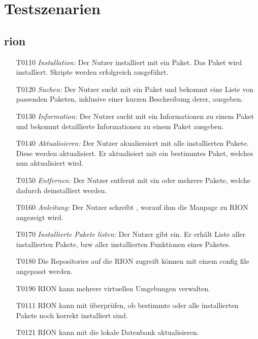 \chapter{Testszenarien}

\section{rion}

\begin{itemize}
	\item[T0110] \textit{Installation:} Der Nutzer installiert mit  ein Paket. Das Paket wird installiert. Skripte werden erfolgreich ausgeführt.
	\item[T0120] \textit{Suchen:} Der Nutzer sucht mit  ein Paket und bekommt eine Liste von passenden Paketen, inklusive einer kurzen Beschreibung derer, ausgeben.
	\item[T0130] \textit{Information:} Der Nutzer sucht mit  ein Informationen zu einem Paket und bekommt detaillierte Informationen zu einem Paket ausgeben.
	\item[T0140] \textit{Aktualisieren:} Der Nutzer akualiersiert mit  alle installierten Pakete. Diese werden aktualisiert. Er aktualisiert mit  ein bestimmtes Paket, welches nun aktualisiert wird.

	\item[T0150] \textit{Entfernen:} Der Nutzer entfernt mit  ein oder mehrere Pakete, welche dadurch deinstalliert werden.
	\item[T0160] \textit{Anleitung:} Der Nutzer schreibt , worauf ihm die Manpage zu RION angezeigt wird.
	\item[T0170] \textit{Installierte Pakete listen:} Der Nutzer gibt  ein. Er erhält Liste aller installierten Pakete, bzw aller installierten Funktionen eines Paketes.
	\item[T0180] Die Repositories auf die RION zugreift können mit einem config file angepasst werden.
	\item[T0190] RION kann mehrere virtuellen Umgebungen verwalten. 
	\item[T0111] RION kann mit 	 überprüfen, ob bestimmte oder alle installierten Pakete noch korrekt installiert sind.
	\item[T0121] RION kann mit  die lokale Datenbank aktualisieren.

\end{itemize}

